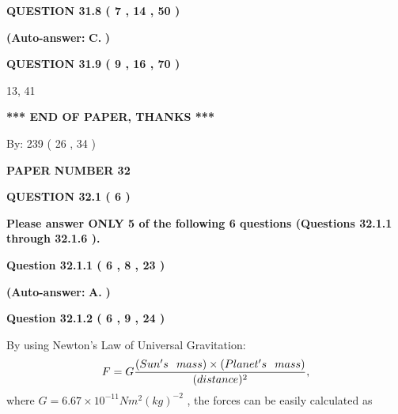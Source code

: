 \documentclass[12pt]{article}
\begin{document}
  
  
{\textbf{\large{QUESTION
31.8 
 (           7 ,          14 ,          50 )
}}}
 
 
{\textbf{(Auto-answer:}}
{\textbf{\large{
C.}}}
{\textbf{)}}
 
 
  
  
{\textbf{\large{QUESTION
31.9 
 (           9 ,          16 ,          70 )
}}}

13,  %
41
 
   
   
   
   
\vspace{1.0in} 
{\textbf{\large{ *** END OF PAPER, THANKS *** }}} 
   
   
\hspace{1.0in} By: 
         239 (          26 ,           34 )
   
   
   
   
\newpage 
\setcounter{page}{ 
    32001 } 
   
   
 {\textbf{ \Large{ PAPER NUMBER           32  }}}
   
   
   
   
  
\vspace{0.2in}
  
{\textbf{\Large{QUESTION
32.1 
 (           6 )
}}}
  
  
{\textbf{\Large{Please answer ONLY  %
           5  %
 of the following  %
           6  %
 questions (Questions  %
32.1.1 %
 through  %
32.1.6 %
 ). }}}
   
   
  
  
{\textbf{\large{Question
32.1.1 
 (           6 ,           8 ,          23 )
}}}
 
 
{\textbf{(Auto-answer:}}
{\textbf{\large{
A.}}}
{\textbf{)}}
 
 
  
  
{\textbf{\large{Question
32.1.2 
 (           6 ,           9 ,          24 )
}}}

By using Newton's Law of Universal Gravitation:
\[
F=G \frac{(Sun's \hspace{0.1in} mass) \times (Planet's \hspace{0.1in} mass)} { (distance)^2},
\]
where
$ G= %
6.67 \times 10^{-11} N m^{2}(kg)^{-2}$ , the forces can be easily calculated as
 
\vspace{0.2in}
 
\end{document}
